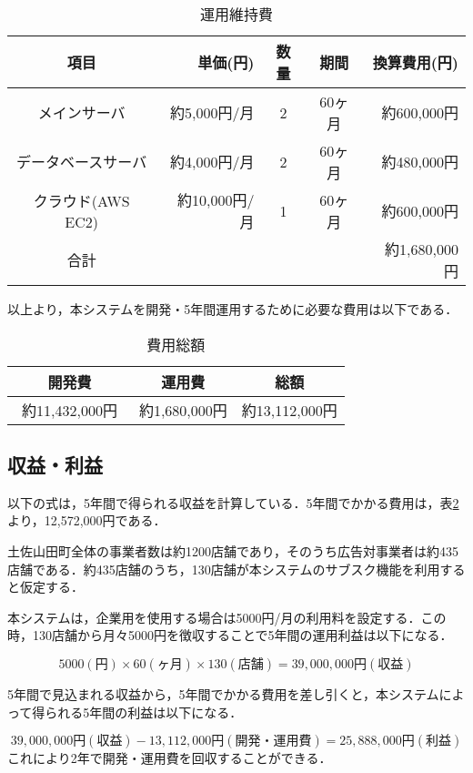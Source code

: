 \begin{table}[h]
  \centering
  \caption{運用維持費}
  \label{fig:Q11}
  \begin{tabular}{crccr}
  \hline
  項目  & 単価(円) & 数量  & 期間 & 換算費用(円) \\ \hline\hline
 
メインサーバ  & 約5,000円/月 & 2& 60ヶ月  & 約600,000円 \\ \hline

データベースサーバ & 約4,000円/月 &2& 60ヶ月 & 約480,000円 \\\hline

クラウド(AWS EC2)  &約10,000円/月&1 &60ヶ月 & 約600,000円 \\ \hline\hline

合計 &  & & & 約1,680,000円\\ \hline
\end{tabular}
\end{table}

以上より，本システムを開発・5年間運用するために必要な費用は以下である．
\begin{table}[h]
  \centering
  \caption{費用総額}
  \label{fig:Q12}
  \begin{tabular}{ccc}
  \hline
  開発費 & 運用費 & 総額  \\ \hline\hline
 約11,432,000円　& 約1,680,000円 & 約13,112,000円\\ \hline

\end{tabular}
\end{table}


\subsection{収益・利益}
以下の式は，5年間で得られる収益を計算している．5年間でかかる費用は，表\ref{fig:Q12}より，12,572,000円である．\par
土佐山田町全体の事業者数は約1200店舗であり，そのうち広告対事業者は約435店舗である．約435店舗のうち，130店舗が本システムのサブスク機能を利用すると仮定する．

本システムは，企業用を使用する場合は5000円/月の利用料を設定する．この時，130店舗から月々5000円を徴収することで5年間の運用利益は以下になる．\par

\[5000(円)\times 60(ヶ月)\times 130(店舗)=39,000,000円(収益)\]


5年間で見込まれる収益から，5年間でかかる費用を差し引くと，本システムによって得られる5年間の利益は以下になる．

\[39,000,000円(収益)-13,112,000円(開発・運用費)=25,888,000円(利益)\]
これにより2年で開発・運用費を回収することができる．








